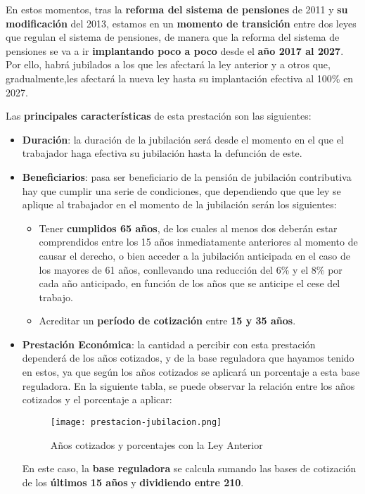 En estos momentos, tras la \textbf{reforma del sistema de pensiones} de 2011 y \textbf{su modificación}  del 2013, estamos en un \textbf{momento de transición} entre dos leyes que regulan el sistema de pensiones, de manera que la reforma del sistema de pensiones se va a ir \textbf{implantando poco a poco} desde el \textbf{año 2017 al 2027}. Por ello, habrá jubilados a los que les afectará la ley anterior y a otros que, gradualmente,les afectará la nueva ley hasta su implantación efectiva al 100\% en 2027.

Las \textbf{principales características} de esta prestación son las siguientes:

\begin{itemize}
    \item \textbf{Duración}: la duración de la jubilación será desde el momento en el que el trabajador haga efectiva su jubilación hasta la defunción de este.

    \item \textbf{Beneficiarios}: pasa ser beneficiario de la pensión de jubilación contributiva hay que cumplir una serie de condiciones, que dependiendo que que ley se aplique al trabajador en el momento de la jubilación serán los siguientes:
    \begin{itemize}
        \item Tener \textbf{cumplidos 65 años}, de los cuales al menos dos deberán estar comprendidos entre los 15 años inmediatamente anteriores al momento de causar el derecho, o bien acceder a la jubilación anticipada en el caso de los mayores de 61 años, conllevando una reducción del 6\% y el 8\% por cada año anticipado, en función de los años que se anticipe el cese del trabajo.
        \item Acreditar un \textbf{período de cotización} entre \textbf{15 y 35 años}.
    \end{itemize}


    \item \textbf{Prestación Económica}: la cantidad a percibir con esta prestación dependerá de los años cotizados, y de la base reguladora que hayamos tenido en estos, ya que según los años cotizados se aplicará un porcentaje a esta base reguladora. En la siguiente tabla, se puede observar la relación entre los años cotizados y el porcentaje a aplicar:

    \begin{figure}[H]
        \centering
        \texttt{[image: prestacion-jubilacion.png]}
        \caption{Años cotizados y porcentajes con la Ley Anterior}
    \end{figure}

    En este caso, la \textbf{base reguladora} se calcula sumando las bases de cotización de los \textbf{últimos 15 años} y \textbf{dividiendo entre 210}.
\end{itemize}


